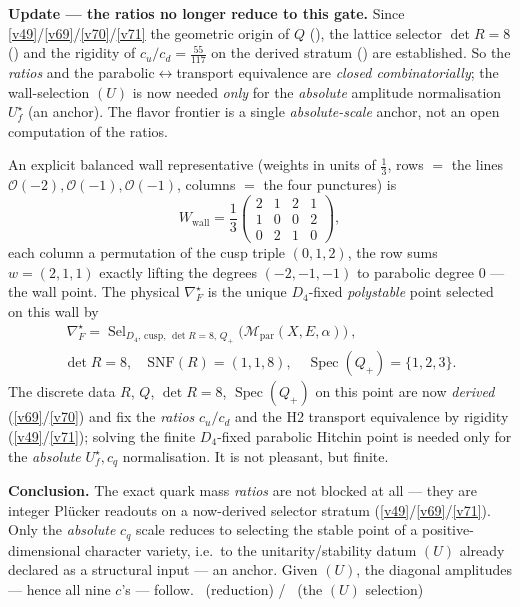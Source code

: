 \documentclass[11pt,a4paper]{article}
\theoremstyle{definition}
\begin{document}
\begin{keybox}
\noindent\textbf{Update --- the ratios no longer reduce to this gate.} Since \vref{v49}/\vref{v69}/\vref{v70}/\vref{v71} the geometric
origin of $Q$ (), the lattice selector $\det R=8$ ()
and the rigidity of $c_u/c_d=\tfrac{55}{117}$ on the derived stratum () are
established. So the \emph{ratios} and the parabolic$\leftrightarrow$transport equivalence are \emph{closed
combinatorially}; the wall-selection $(U)$ is now needed \emph{only} for the \emph{absolute} amplitude
normalisation $U_f^\star$ (an anchor). The flavor frontier is a single \emph{absolute-scale} anchor, not an
open computation of the ratios.

\begin{keybox}
An explicit balanced wall representative (weights in units of $\tfrac13$, rows $=$ the lines
$\mathcal O(-2),\mathcal O(-1),\mathcal O(-1)$, columns $=$ the four punctures) is
\[
  W_{\mathrm{wall}}=\frac13\begin{pmatrix}2&1&2&1\\1&0&0&2\\0&2&1&0\end{pmatrix},
\]
each column a permutation of the cusp triple $(0,1,2)$, the row sums $w=(2,1,1)$ exactly lifting the
degrees $(-2,-1,-1)$ to parabolic degree $0$ --- the wall point. The physical $\nabla_F^\star$ is the unique
$D_4$-fixed \emph{polystable} point selected on this wall by
\[
\begin{gathered}
  \boxed{\ \nabla_F^\star=\operatorname{Sel}_{D_4,\,\mathrm{cusp},\,\det R=8,\,Q_+}
  \bigl(\mathcal M_{\mathrm{par}}(X,E,\alpha)\bigr)\ },\\[3pt]
  \det R=8,\quad \mathrm{SNF}(R)=(1,1,8),\quad \operatorname{Spec}(Q_+)=\{1,2,3\}.
\end{gathered}
\]
The discrete data $R$, $Q$, $\det R=8$, $\operatorname{Spec}(Q_+)$ on this point are now \emph{derived}
(\vref{v69}/\vref{v70}) and fix the \emph{ratios} $c_u/c_d$ and the H2 transport equivalence by rigidity (\vref{v49}/\vref{v71});
solving the finite $D_4$-fixed parabolic Hitchin point is needed only for the \emph{absolute} $U_f^\star,c_q$
normalisation. It is not pleasant, but finite. 
\end{keybox}
\textbf{Conclusion.} The exact quark mass \emph{ratios} are not blocked at all --- they are integer Plücker
readouts on a now-derived selector stratum (\vref{v49}/\vref{v69}/\vref{v71}). Only the \emph{absolute} $c_q$ scale reduces to
selecting the stable point of a positive-dimensional character variety, i.e.\ to the
unitarity/stability datum $(U)$ already declared as a structural input --- an anchor. Given $(U)$, the diagonal
amplitudes --- hence all nine $c$'s --- follow. \mE\ (reduction) / \mO\ (the $(U)$ selection)
\end{keybox}
\end{document}
